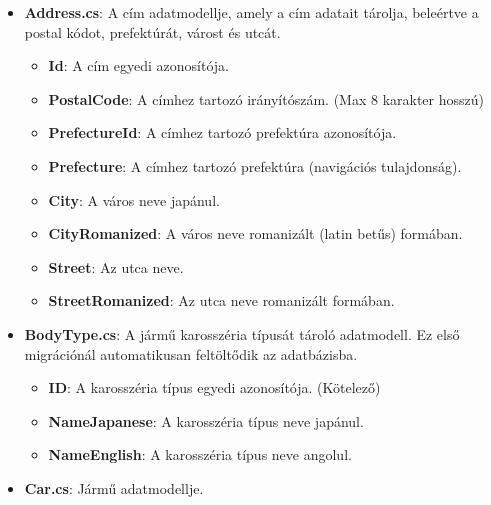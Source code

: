\documentclass{report}[11pt]
\begin{document}
\begin{itemize}
    \item \textbf{Address.cs}: A cím adatmodellje, amely a cím adatait tárolja, beleértve a postal kódot, prefektúrát, várost és utcát.

    \begin{itemize}
        \item \textbf{Id}: A cím egyedi azonosítója.
        \item \textbf{PostalCode}: A címhez tartozó irányítószám. (Max 8 karakter hosszú)
        \item \textbf{PrefectureId}: A címhez tartozó prefektúra azonosítója.
        \item \textbf{Prefecture}: A címhez tartozó prefektúra (navigációs tulajdonság).
        \item \textbf{City}: A város neve japánul.
        \item \textbf{CityRomanized}: A város neve romanizált (latin betűs) formában.
        \item \textbf{Street}: Az utca neve.
        \item \textbf{StreetRomanized}: Az utca neve romanizált formában.
    \end{itemize}

    \item \textbf{BodyType.cs}: A jármű karosszéria típusát tároló adatmodell. Ez első migrációnál automatikusan feltöltődik az adatbázisba.

    \begin{itemize}
        \item \textbf{ID}: A karosszéria típus egyedi azonosítója. (Kötelező)
        \item \textbf{NameJapanese}: A karosszéria típus neve japánul.
        \item \textbf{NameEnglish}: A karosszéria típus neve angolul.
    \end{itemize}
    
    \item \textbf{Car.cs}: Jármű adatmodellje.


\end{itemize}
\end{document}
